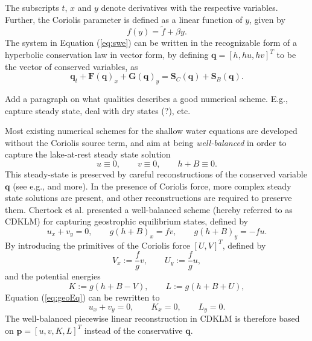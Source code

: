 \documentclass[11pt, a4paper]{article}
\newcommand{\vecF}[0]{\bm{F}}
\newcommand{\vecS}[0]{\bm{S}}
\newcommand{\vecG}[0]{\bm{G}}
\newcommand{\vecq}[0]{\bm{q}}
\newcommand{\vecp}[0]{\bm{p}}
\newcommand{\red}[1]{{\color{red}#1}}
\newcommand{\eref}[1]{Equation (\ref{eq:#1})}
\begin{document}
The subscripts $t$, $x$ and $y$ denote derivatives with the respective variables.
Further, the Coriolis parameter is defined as a linear function of $y$, given by
\begin{equation}
	f(y) = \tilde{f} + \beta y.
	\label{eq:coriolis}
\end{equation}
The system in \eref{swe} can be written in the recognizable form of a hyperbolic conservation law in vector form, by defining $\vecq = [h, hu, hv]^T$ to be the vector of conserved variables, as
\begin{equation}
	\vecq_t  + \vecF(\vecq)_x + \vecG(\vecq)_y = \vecS_C(\vecq) +  \vecS_B(\vecq).
	\label{eq:swevec}
\end{equation}


\red{Add a paragraph on what qualities describes a good numerical scheme. E.g., capture steady state, deal with dry states (?), etc.}

Most existing numerical schemes for the shallow water equations are developed without the Coriolis source term, and aim at being \emph{well-balanced} in order to capture the lake-at-rest steady state solution
\begin{equation}
	u \equiv 0, \qquad v \equiv 0, \qquad h+B \equiv 0.
	\label{eq:lakeAtRest}
\end{equation}
This steady-state is preserved by careful reconstructions of the conserved variable $\vecq$ (see e.g., \cite{kurganovPetrova2007} \red{and more}).
In the presence of Coriolis force, more complex steady state solutions are present, and other reconstructions are required to preserve them.
Chertock et al. \cite{CDKLM16} presented a well-balanced scheme (hereby referred to as CDKLM) for capturing geostrophic equilibrium states, defined by
\begin{equation}
	u_x + v_y = 0, \qquad g(h+B)_x = fv, \qquad g(h+B)_y = -fu.
	\label{eq:geoEq}
\end{equation}
By introducing the primitives of the Coriolis force $[U, V]^T$, defined by
\begin{equation}
	V_x := \frac{f}{g}v, \qquad U_y := \frac{f}{g}u,
	\label{eq:coriolisPrimitives}
\end{equation}
and the potential energies
\begin{equation}
	K := g(h + B - V), \qquad L := g(h + B + U),
	\label{eq:coriolisPotEnergies}
\end{equation}
\eref{geoEq} can be rewritten to 
\begin{equation}
	u_x + v_y  = 0, \qquad K_x = 0, \qquad L_y = 0.
	\label{eq:geoEq2}
\end{equation}
The well-balanced piecewise linear reconstruction in CDKLM is therefore based on $\vecp = [u, v, K, L]^T$ instead of the conservative $\vecq$.
\end{document}

